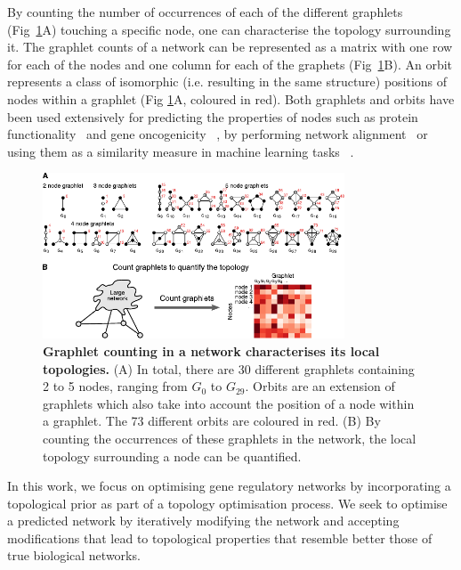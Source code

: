 By counting the number of occurrences of each of the different graphlets (Fig~\ref{fig_graphlets}A) touching a specific node, one can characterise the topology surrounding it. The graphlet counts of a network can be represented as a matrix with one row for each of the nodes and one column for each of the graphets (Fig~\ref{fig_graphlets}B). 
An orbit represents a class of isomorphic (i.e. resulting in the same structure) positions of nodes within a graphlet (Fig \ref{fig_graphlets}A, coloured in red).
Both graphlets and orbits have been used extensively for predicting the properties of nodes such as protein functionality~ \cite{milenkovic_uncoveringbiologicalnetwork_2008,guerrero_characterizationproteasomeinteraction_2008,singh_graphletsignaturebasedscoring_2014} and gene oncogenicity~ \cite{milenkovic_optimalnetworkalignment_2010}, by performing network alignment~ \cite{kuchaiev_topologicalnetworkalignment_2010,milenkovic_globalnetworkalignment_2013} or using them as a similarity measure in machine learning tasks~ \cite{shervashidze_efficientgraphletkernels_2009,vacic_graphletkernelsprediction_2010}. 

\begin{figure}[ht!]
	\centering
	\includegraphics[width=0.8\textwidth]{fig/figure1.pdf}
	\caption{%
		{\bf Graphlet counting in a network characterises its local topologies.}
		(A) In total, there are 30 different graphlets containing 2 to 5 nodes, ranging from $G_0$ to $G_{29}$. Orbits are an extension of graphlets which also take into account the position of a node within a graphlet. The 73 different orbits are coloured in red. (B) By counting the occurrences of these graphlets in the network, the local topology surrounding a node can be quantified.
	}
	\label{fig_graphlets}
\end{figure}


In this work, we focus on optimising gene regulatory networks by incorporating a topological prior as part of a topology optimisation process. We seek to optimise a predicted network by iteratively modifying the network and accepting modifications that lead to topological properties that resemble better those of true biological networks.

